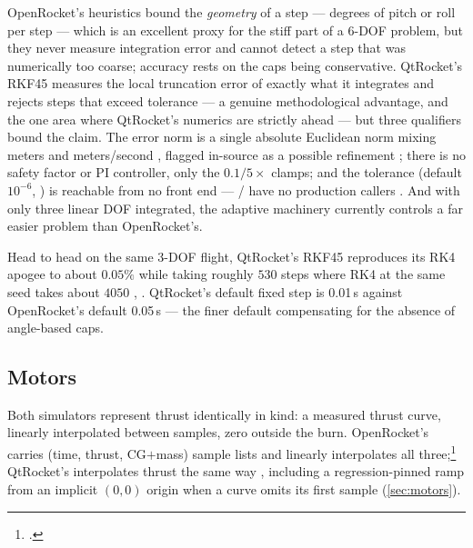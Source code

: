 \begin{keyinsight}
OpenRocket's heuristics bound the \emph{geometry} of a step --- degrees of pitch or roll per
step --- which is an excellent proxy for the stiff part of a 6-DOF problem, but they never
measure integration error and cannot detect a step that was numerically too coarse; accuracy
rests on the caps being conservative. QtRocket's RKF45 measures the local truncation error
of exactly what it integrates and rejects steps that exceed tolerance --- a genuine
methodological advantage, and the one area where QtRocket's numerics are strictly ahead ---
but three qualifiers bound the claim. The error norm is a single absolute Euclidean norm
mixing meters and meters/second , flagged in-source as a possible
refinement ; there is no safety factor or PI controller, only the
$0.1/5\times$ clamps; and the tolerance (default $10^{-6}$, ) is
reachable from no front end --- / have no
production callers . And with only three linear DOF
integrated, the adaptive machinery currently controls a far easier problem than OpenRocket's.
\end{keyinsight}

Head to head on the same 3-DOF flight, QtRocket's RKF45 reproduces its RK4 apogee to about
$0.05\%$ while taking roughly $530$ steps where RK4 at the same seed takes about $4050$
, .
QtRocket's default fixed step is 0.01\,s  against OpenRocket's
default 0.05\,s --- the finer default compensating for the absence of angle-based caps.

\subsection{Motors}\label{app:or-methods-motors}

Both simulators represent thrust identically in kind: a measured thrust curve, linearly
interpolated between samples, zero outside the burn. OpenRocket's
 carries (time, thrust, CG$+$mass) sample lists and linearly
interpolates all three;\footnote{.} QtRocket's
 interpolates thrust the same way ,
including a regression-pinned ramp from an implicit $(0,0)$ origin when a curve omits its
first sample  (\cref{sec:motors}).

